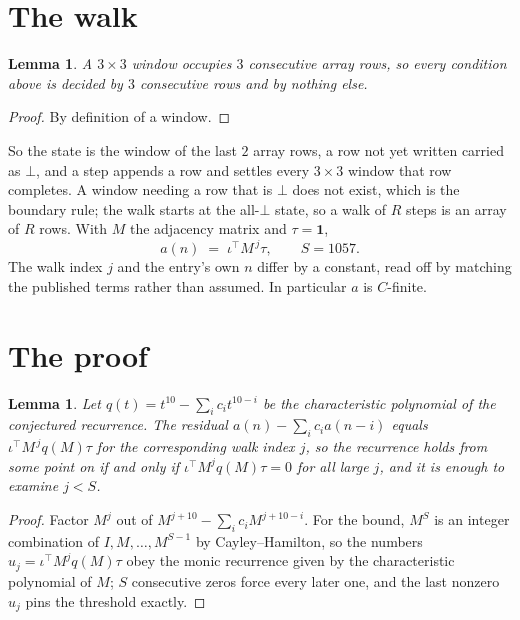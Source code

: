 \documentclass[11pt,a4paper]{article}
\theoremstyle{plain}
\newtheorem{lemma}[theorem]{Lemma}
\theoremstyle{definition}
\begin{document}
\section{The walk}

\begin{lemma}\label{lem:win}
A $3\times3$ window occupies $3$ consecutive array rows, so every condition above is
decided by $3$ consecutive rows and by nothing else.
\end{lemma}

\begin{proof}
By definition of a window.
\end{proof}

So the state is the window of the last $2$ array rows, a row not yet written carried as
$\bot$, and a step appends a row and settles every $3\times3$ window that row completes. A
window needing a row that is $\bot$ does not exist, which is the boundary rule; the walk starts
at the all-$\bot$ state, so a walk of $R$ steps is an array of $R$ rows. With $M$ the adjacency
matrix and $\tau=\mathbf{1}$,
\[
a(n)\;=\;\iota^{\!\top}M^{\,j}\tau ,\qquad S=1057.
\]
The walk index $j$ and the entry's own $n$ differ by a constant, read off by matching the
published terms rather than assumed. In particular $a$ is $C$-finite.

\section{The proof}

\begin{lemma}\label{lem:crit}
Let $q(t)=t^{10}-\sum_i c_it^{10-i}$ be the characteristic polynomial of the
conjectured recurrence. The residual $a(n)-\sum_ic_ia(n-i)$ equals
$\iota^{\!\top}M^{\,j}q(M)\tau$ for the corresponding walk index $j$, so the recurrence
holds from some point on if and only if $\iota^{\!\top}M^{j}q(M)\tau=0$ for all large $j$,
and it is enough to examine $j<S$.
\end{lemma}

\begin{proof}
Factor $M^{j}$ out of $M^{j+10}-\sum_ic_iM^{j+10-i}$. For the bound, $M^{S}$
is an integer combination of $I,M,\dots,M^{S-1}$ by Cayley--Hamilton, so the numbers
$u_j=\iota^{\!\top}M^{j}q(M)\tau$ obey the monic recurrence given by the characteristic
polynomial of $M$; $S$ consecutive zeros force every later one, and the last nonzero $u_j$
pins the threshold exactly.
\end{proof}
\end{document}
